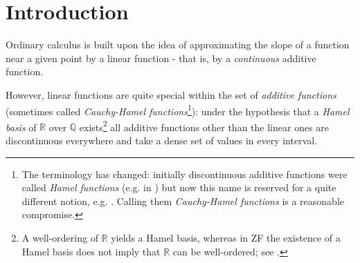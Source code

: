 \documentclass[11pt]{amsart} %
\theoremstyle{definition}
\newcommand{\R}{\mathbb{R}}
\newcommand{\Q}{\mathbb{Q}}
\begin{document}
\maketitle


\tableofcontents %
    


\section{Introduction}

Ordinary calculus is built upon the idea of approximating the slope of a function near a given point by a linear function - that is, by a \emph{continuous} additive function. 

However, linear functions are quite special within the set of \emph{additive functions} \cite{12} (sometimes called \emph{Cauchy-Hamel functions}\footnote{The terminology has changed: initially discontinuous additive functions were called \emph{Hamel functions} (e.g. in \cite{12}) but now this name is  reserved for a quite different notion, e.g. \cite{14}. Calling them \emph{Cauchy-Hamel functions} is a reasonable compromise.}): under the hypothesis that a \emph{Hamel basis} of $\R$ over $\Q$ exists\footnote{A well-ordering of \(\R\) yields a Hamel basis, whereas in ZF the existence of a Hamel basis does not imply that \(\R\) can be well-ordered; see \cite{3}.} all additive functions other than the linear ones are  discontinuous everywhere and take a dense set of values in every interval. 
\end{document}

